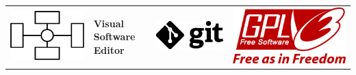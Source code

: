 \documentclass[11pt]{article}
\begin{document}
	\clearpage
	\thispagestyle{empty}

	\hspace{-4.0 cm}
	{
		\begin{tabular}{C{3.8 cm}lC{3.8 cm}C{3.8 cm}}
			\vspace{0.3 cm}\includegraphics[width=100 pt]{logo} &
			\textbf{Visual Software Editor} &
			\vspace{0.3 cm}\includegraphics[width=100 pt]{git_logo_black} &
			\vspace{0.3 cm}\includegraphics[width=100 pt]{gplv3_logo_red}
		\end{tabular}
	}
\end{document}
